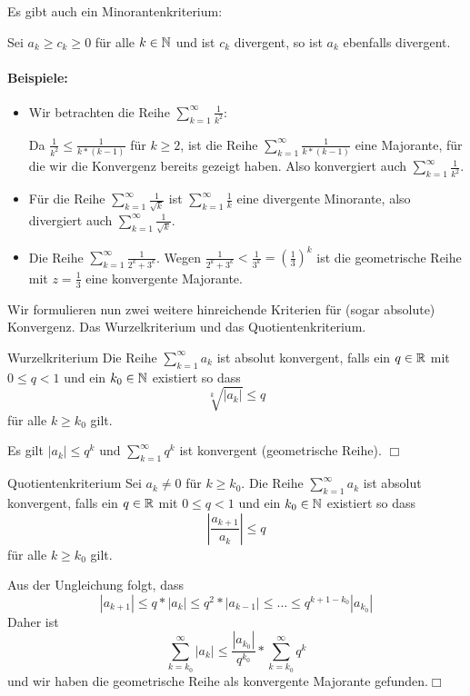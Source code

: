 \par
Es gibt auch ein Minorantenkriterium:

Sei $a_k\geq c_k\geq 0$ für alle $k\in\mathbb{N}$ und ist $c_k$ divergent, so ist $a_k$ ebenfalls divergent.

\paragraph{Beispiele:}
\begin{itemize}
	\item Wir betrachten die Reihe $\sum_{k=1}^\infty \frac1{k^2}$:

	Da $\frac1{k^2}\leq\frac{1}{k*(k-1)}$ für $k\geq 2$, ist die Reihe $\sum_{k=1}^\infty \frac{1}{k*(k-1)}$ eine Majorante, für die wir die Konvergenz bereits gezeigt haben. Also konvergiert auch $\sum_{k=1}^\infty \frac1{k^2}$.

	\item Für die Reihe $\sum_{k=1}^\infty \frac{1}{\sqrt k}$ ist $\sum_{k=1}^\infty \frac{1}{k}$ eine divergente Minorante, also divergiert auch $\sum_{k=1}^\infty \frac{1}{\sqrt k}$.

	\item Die Reihe $\sum_{k=1}^\infty \frac{1}{2^k+3^k}$. Wegen $\frac{1}{2^k+3^k}<\frac{1}{3^k}=\left(\frac13\right)^k$ ist die geometrische Reihe mit $z=\frac13$ eine konvergente Majorante.
\end{itemize}

Wir formulieren nun zwei weitere hinreichende Kriterien für (sogar absolute) Konvergenz. Das Wurzelkriterium und das Quotientenkriterium.

\begin{satz}{Wurzelkriterium}
	Die Reihe $\sum_{k=1}^\infty a_k$ ist absolut konvergent, falls ein $q\in\mathbb{R}$ mit $0\leq q<1$ und ein $k_0\in\mathbb{N}$ existiert so dass
	\begin{equation*}
		\sqrt[k]{|a_k|}\leq q
	\end{equation*}
	für alle $k\geq k_0$ gilt.
\end{satz}
\beweis
Es gilt $|a_k|\leq q^k$ und $\sum_{k=1}^\infty q^k$ ist konvergent (geometrische Reihe). \hfill $\Box$


\begin{satz}{Quotientenkriterium}
	Sei $a_k\neq 0$ für $k\geq k_0$. Die Reihe $\sum_{k=1}^\infty a_k$ ist absolut konvergent, falls ein $q\in\mathbb{R}$ mit $0\leq q<1$ und ein $k_0\in\mathbb{N}$ existiert so dass
	\begin{equation*}
		\left|\frac{a_{k+1}}{a_k}\right|\leq q
	\end{equation*}
	für alle $k\geq k_0$ gilt.
\end{satz}
\beweis
Aus der Ungleichung folgt, dass
\begin{equation*}
	|a_{k+1}|\leq q*|a_k|\leq q^2*|a_{k-1}|\leq \ldots \leq q^{k+1-k_0}|a_{k_0}|
\end{equation*}
Daher ist
\begin{equation*}
	\sum_{k=k_0}^\infty |a_k|\leq \frac{|a_{k_0}|}{q^{k_0}}* \sum_{k=k_0}^\infty q^k
\end{equation*}
und wir haben die geometrische Reihe als konvergente Majorante gefunden.\hfill$\Box$

